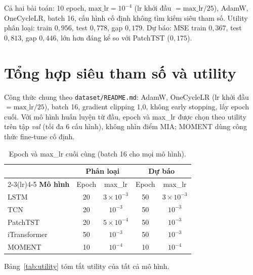 \documentclass[12pt,a4paper]{report}
\begin{document}
Cả hai bài toán: 10 epoch, $\text{max\_lr} = 10^{-4}$ (lr khởi đầu $= \text{max\_lr}/25$), AdamW, OneCycleLR, batch 16, cấu hình cố định không tìm kiếm siêu tham số. Utility phân loại: train $0{,}956$, test $0{,}778$, gap $0{,}179$. Dự báo: MSE train $0{,}367$, test $0{,}813$, gap $0{,}446$, lớn hơn đáng kể so với PatchTST ($0{,}175$).

\section{Tổng hợp siêu tham số và utility}

Công thức chung theo \texttt{dataset/README.md}: AdamW, OneCycleLR (lr khởi đầu $= \text{max\_lr}/25$), batch 16, gradient clipping 1,0, không early stopping, lấy epoch cuối. Với mô hình huấn luyện từ đầu, epoch và max\_lr được chọn theo utility trên tập \textit{val} (tối đa 6 cấu hình), không nhìn điểm MIA; MOMENT dùng công thức fine-tune cố định.

\begin{table}[H]
\centering
\caption{Epoch và max\_lr cuối cùng (batch 16 cho mọi mô hình).}
\label{tab:hparams}
\begin{tabular}{lcccc}
\toprule
 & \multicolumn{2}{c}{\textbf{Phân loại}} & \multicolumn{2}{c}{\textbf{Dự báo}} \\
\cmidrule(lr){2-3}\cmidrule(lr){4-5}
\textbf{Mô hình} & Epoch & max\_lr & Epoch & max\_lr \\
\midrule
LSTM         & 20 & $3 \times 10^{-3}$ & 50 & $3 \times 10^{-3}$ \\
TCN          & 20 & $10^{-3}$          & 50 & $10^{-3}$ \\
PatchTST     & 20 & $5 \times 10^{-4}$ & 50 & $10^{-3}$ \\
iTransformer & 50 & $10^{-3}$          & 50 & $10^{-3}$ \\
MOMENT       & 10 & $10^{-4}$          & 10 & $10^{-4}$ \\
\bottomrule
\end{tabular}
\end{table}

Bảng~\ref{tab:utility} tóm tắt utility của tất cả mô hình.
\end{document}
